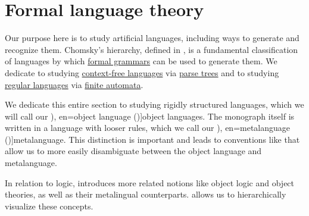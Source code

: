 \section{Formal language theory}\label{sec:formal_language_theory}

Our purpose here is to study artificial languages, including ways to generate and recognize them. Chomsky's hierarchy, defined in , is a fundamental classification of languages by which \hyperref[def:formal_grammar]{formal grammars} can be used to generate them. We dedicate  to studying \hyperref[def:chomsky_hierarchy/context_free]{context-free languages} via \hyperref[def:parse_tree]{parse trees} and  to studying \hyperref[def:chomsky_hierarchy/regular]{regular languages} via \hyperref[def:finite_automaton]{finite automata}.

\begin{concept}\label{con:metalanguage}
  We dedicate this entire section to studying rigidly structured languages, which we will call our \term[ru=предметный язык (\cite[35]{Герасимов2011Вычислимость}), en=object language (\cite[3]{Kleene2002Logic})]{object languages}. The monograph itself is written in a language with looser rules, which we call our \term[ru=метаязык (\cite[35]{Герасимов2011Вычислимость}), en=metalanguage (\cite[3]{Kleene2002Logic})]{metalanguage}. This distinction is important and leads to conventions like  that allow us to more easily disambiguate between the object language and metalanguage.

  In relation to logic,  introduces more related notions like object logic and object theories, as well as their metalingual counterparts.  allows us to hierarchically visualize these concepts.
\end{concept}

